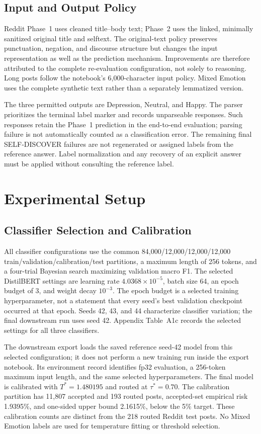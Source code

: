 \documentclass{ieeeaccess}
\begin{document}
\subsection{Input and Output Policy}
Reddit Phase~1 uses cleaned title--body text; Phase~2 uses the linked, minimally sanitized original title and selftext. The original-text policy preserves punctuation, negation, and discourse structure but changes the input representation as well as the prediction mechanism. Improvements are therefore attributed to the complete re-evaluation configuration, not solely to reasoning. Long posts follow the notebook's 6,000-character input policy. Mixed Emotion uses the complete synthetic text rather than a separately lemmatized version.

The three permitted outputs are Depression, Neutral, and Happy. The parser prioritizes the terminal label marker and records unparseable responses. Such responses retain the Phase~1 prediction in the end-to-end evaluation; parsing failure is not automatically counted as a classification error. The remaining final SELF-DISCOVER failures are not regenerated or assigned labels from the reference answer. Label normalization and any recovery of an explicit answer must be applied without consulting the reference label.
\section{Experimental Setup}
\subsection{Classifier Selection and Calibration}
All classifier configurations use the common 84,000/12,000/12,000/12,000 train/validation/calibration/test partitions, a maximum length of 256 tokens, and a four-trial Bayesian search maximizing validation macro F1. The selected DistilBERT settings are learning rate $4.0368\times10^{-5}$, batch size 64, an epoch budget of 3, and weight decay $10^{-3}$. The epoch budget is a selected training hyperparameter, not a statement that every seed's best validation checkpoint occurred at that epoch. Seeds 42, 43, and 44 characterize classifier variation; the final downstream run uses seed 42. Appendix Table~A1c records the selected settings for all three classifiers.

The downstream export loads the saved reference seed-42 model from this selected configuration; it does not perform a new training run inside the export notebook. Its environment record identifies fp32 evaluation, a 256-token maximum input length, and the same selected hyperparameters. The final model is calibrated with $T^*=1.480195$ and routed at $\tau^*=0.70$. The calibration partition has 11,807 accepted and 193 routed posts, accepted-set empirical risk 1.9395\%, and one-sided upper bound 2.1615\%, below the 5\% target. These calibration counts are distinct from the 218 routed Reddit test posts. No Mixed Emotion labels are used for temperature fitting or threshold selection.
\end{document}
